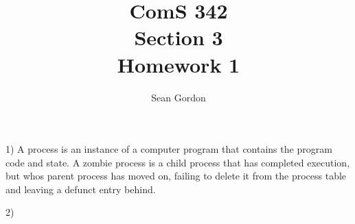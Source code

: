 \documentclass[12pt]{article}
\title{ComS 342\\Section 3\\Homework 1}
\author{Sean Gordon}
\begin{document}
\maketitle

1) A process is an instance of a computer program that contains the program code and state. A zombie process is a child process that has completed execution, but whos parent process has moved on, failing to delete it from the process table and leaving a defunct entry behind.

2) 


\end{document}
